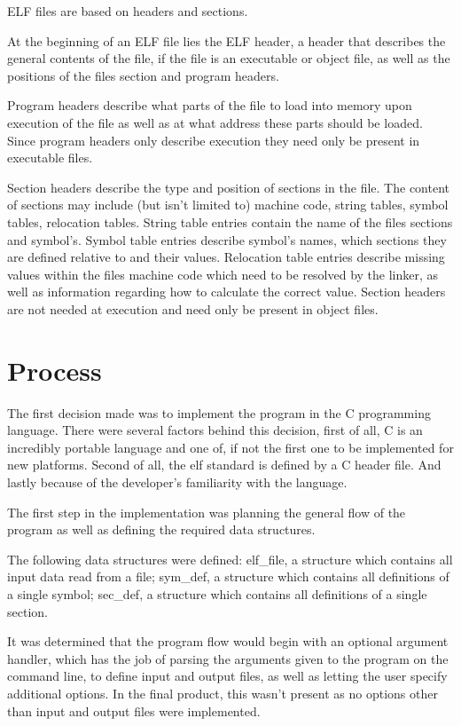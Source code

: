\documentclass{article}
\begin{document}
ELF files are based on headers and sections.\autocite{ELFSpec}

At the beginning of an ELF file lies the ELF header, a header that describes the general contents of the file, if the file is an executable or object file, as well as the positions of the files section and program headers.\autocite{ELFSpec}

Program headers describe what parts of the file to load into memory upon execution of the file as well as at what address these parts should be loaded. Since program headers only describe execution they need only be present in executable files.\autocite{ELFSpec}

Section headers describe the type and position of sections in the file. The content of sections may include (but isn't limited to) machine code, string tables, symbol tables, relocation tables. String table entries contain the name of the files sections and symbol's. Symbol table entries describe symbol's names, which sections they are defined relative to and their values. Relocation table entries describe missing values within the files machine code which need to be resolved by the linker, as well as information regarding how to calculate the correct value. Section headers are not needed at execution and need only be present in object files.\autocite{ELFSpec}

\section{Process}

The first decision made was to implement the program in the C programming language. There were several factors behind this decision, first of all, C is an incredibly portable language and one of, if not the first one to be implemented for new platforms. Second of all, the elf standard is defined by a C header file. And lastly because of the developer's familiarity with the language.

The first step in the implementation was planning the general flow of the program as well as defining the required data structures.

The following data structures were defined: elf\_file, a structure which contains all input data read from a file; sym\_def, a structure which contains all definitions of a single symbol; sec\_def, a structure which contains all definitions of a single section.

It was determined that the program flow would begin with an optional argument handler, which has the job of parsing the arguments given to the program on the command line, to define input and output files, as well as letting the user specify additional options. In the final product, this wasn't present as no options other than input and output files were implemented.
\end{document}
